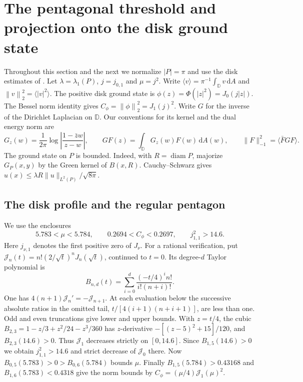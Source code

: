 \documentclass[11pt,a4paper,reqno]{amsart}
\theoremstyle{remark}
\numberwithin{equation}{section}
\newcommand{\dd}{\,\mathrm d}
\newcommand{\davg}[1]{\langle #1\rangle}
\newcommand{\norm}[1]{\left\|#1\right\|_2}
\newcommand{\Cphi}{C_\phi}
\newcommand{\Jcal}{\mathcal J}
\newcommand{\D}{\mathbb D}
\begin{document}
\section{The pentagonal threshold and projection onto the disk ground state}
\label{sec:disk}
Throughout this section and the next we normalize $|P|=\pi$ and use the disk
estimates of \cite{cheng}. Let $\lambda=\lambda_1(P)$, $j=j_{0,1}$ and
$\mu=j^2$. Write $\davg{v}=\pi^{-1}\int_\D v\dd A$ and
$\norm{v}^2=\davg{|v|^2}$. The positive disk ground state is
$\phi(z)=\Phi(|z|^2)=J_0(j|z|)$. The Bessel norm identity gives
$\Cphi=\norm{\phi}^2=J_1(j)^2$. Write $G$ for the inverse of the Dirichlet
Laplacian on $\D$. Our conventions for its kernel and the dual energy norm are
\[
 G_z(w)=\frac{1}{2\pi}\log\left|\frac{1-\bar zw}{z-w}\right|,\qquad
 GF(z)=\int_\D G_z(w)F(w)\dd A(w),\qquad \|F\|_{-1}^2=\davg{\bar F GF}.
\]
The ground state on $P$ is bounded. Indeed, with $R=\operatorname{diam}P$,
majorize $G_P(x,y)$ by the Green kernel of $B(x,R)$. Cauchy--Schwarz gives
$u(x)\le\lambda R\|u\|_{L^2(P)}/\sqrt{8\pi}$.

\subsection{The disk profile and the regular pentagon}
We use the enclosures
\begin{equation}\label{eq:disk-constants}
  5.783<\mu<5.784,\qquad
  0.2694<\Cphi<0.2697,\qquad
  j_{1,1}^2>14.6.
\end{equation}
Here $j_{\nu,1}$ denotes the first positive zero of $J_\nu$. For a rational
verification, put $\Jcal_n(t)=n!(2/\sqrt t)^n J_n(\sqrt t)$, continued to
$t=0$. Its degree-$d$ Taylor polynomial is
\[
  B_{n,d}(t)=\sum_{i=0}^d\frac{(-t/4)^i n!}{i!(n+i)!}.
\]
One has $4(n+1)\Jcal_n'=-\Jcal_{n+1}$. At each evaluation below the
successive absolute ratios in the omitted tail, $t/[4(i+1)(n+i+1)]$, are
less than one. Odd and even truncations give lower and upper bounds.
With $z=t/4$, the cubic $B_{2,3}=1-z/3+z^2/24-z^3/360$ has $z$-derivative
$-[(z-5)^2+15]/120$, and $B_{2,3}(14.6)>0$. Thus $\Jcal_1$ decreases
strictly on $[0,14.6]$. Since $B_{1,5}(14.6)>0$ we obtain $j_{1,1}^2>14.6$
and strict decrease of $\Jcal_0$ there. Now
$B_{0,5}(5.783)>0>B_{0,6}(5.784)$ bounds $\mu$. Finally
$B_{1,5}(5.784)>0.43168$ and $B_{1,6}(5.783)<0.4318$ give the norm
bounds by $\Cphi=(\mu/4)\Jcal_1(\mu)^2$.
\end{document}
